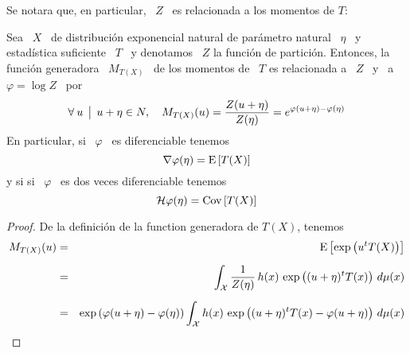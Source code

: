 Se notara que, en particular, \ $Z$ \ es relacionada a los momentos de $T$:
%
\begin{teorema}
%
  Sea \  $X$ \  de distribuci\'on exponencial  natural de par\'ametro  natural \
  $\eta$ \ y estad\'istica suficiente \ $T$  \ y denotamos \ $Z$ la funci\'on de
  partici\'on. Entonces, la funci\'on generadora  \ $M_{T(X)}$ \ de los momentos
  de \ $T$ es relacionada a \ $Z$ \ y \ a \ $\varphi = \log Z$ \ por
  \[
  \forall \: u \:\: \big| \:\: u+\eta \in N, \quad M_{T(X)}(u) = \frac{Z(u+\eta)}{Z(\eta)} =
  e^{\varphi(u+\eta) - \varphi(\eta)}
  \]
  En particular, si \  $\varphi$ \ es diferenciable tenemos
  \[
  \nabla \varphi (\eta) = \operatorname{E}\left[ T(X) \right]
  \]
  y si si \ $\varphi$ \ es dos veces diferenciable tenemos
  \[
  \mathcal{H} \varphi (\eta) = \operatorname{Cov}\left[ T(X) \right]
  \]

\end{teorema}
%
\begin{proof}
  De la definici\'on de la function generadora de $T(X)$, tenemos
  \begin{eqnarray*}
  M_{T(X)}(u) & = &\operatorname{E}\left[ \exp\left( u^t T(X) \right) \right]\\[2mm]
  & = & \int_{\mathcal{X}} \frac{1}{Z(\eta)} \, h(x) \, \exp\left( (u + \eta)^t T(x) \right) \,
  d\mu(x)\\[2mm]
& = & \exp\left( \varphi(u+\eta) - \varphi(\eta) \right) \int_{\mathcal{X}} h(x) \, \exp\left( (u + \eta)^t T(x) - \varphi(u+\eta) \right) \, d\mu(x)
  \end{eqnarray*}
\end{proof}


